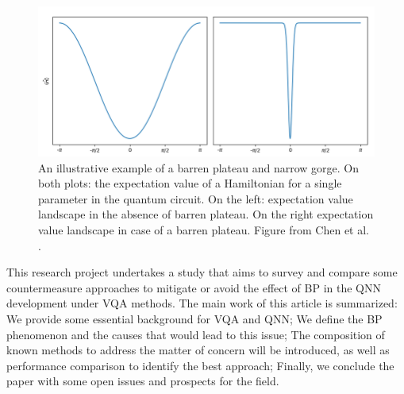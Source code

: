 \begin{figure}[h]
    \centering
    \includegraphics[width=\textwidth]{src/Appendices/example-of-a-barren-plateau.png}
    \caption{
        An illustrative example of a barren plateau and narrow gorge.
        On both plots: the expectation value of a Hamiltonian for a single parameter in the quantum circuit.
        On the left: expectation value landscape in the absence of barren plateau. 
        On the right expectation value landscape in case of a barren plateau.
        Figure from Chen et al. \cite{tillyVariationalQuantumEigensolver2021}.
    }
    \label{fig: Barren Plateau Example}
\end{figure}

This research project undertakes a study that aims to survey and compare some countermeasure approaches to mitigate or avoid the effect of BP in the QNN development under VQA methods. 
The main work of this article is summarized: 
We provide some essential background for VQA and QNN;
We define the BP phenomenon and the causes that would lead to this issue; 
The composition of known methods to address the matter of concern will be introduced, as well as performance comparison to identify the best approach; 
Finally, we conclude the paper with some open issues and prospects for the field.
